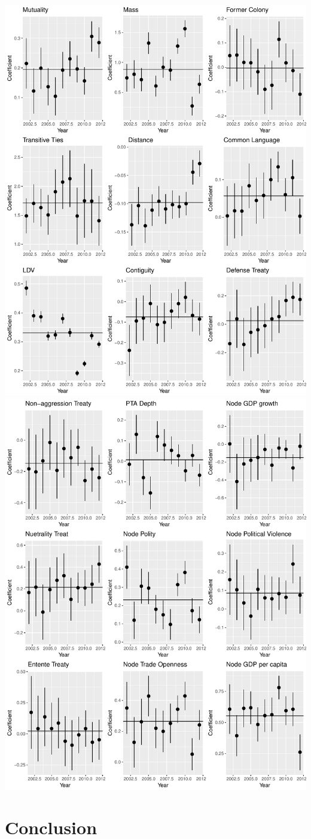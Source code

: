 \documentclass{article}
\begin{document}
\includegraphics[scale=.8]{draft_figures/rope1.pdf}\\
\includegraphics[scale=.8]{draft_figures/rope2.pdf}\\



\section{Conclusion}


\newpage


\end{document}
